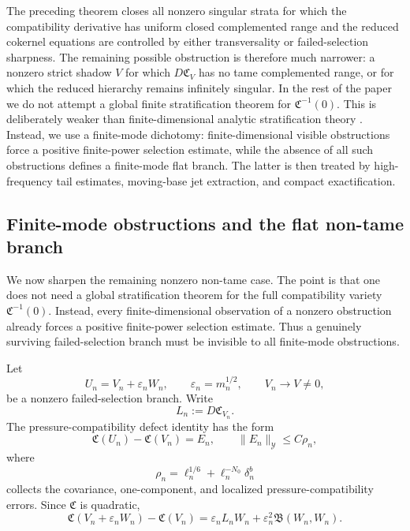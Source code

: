 \documentclass[11pt]{article}
\numberwithin{equation}{section}
\theoremstyle{plain}
\theoremstyle{definition}
\theoremstyle{remark}
\newcommand{\calB}{\mathfrak B}
\newcommand{\calC}{\mathfrak C}
\newcommand{\calY}{\mathcal Y}
\begin{document}
The preceding theorem closes all nonzero singular strata for which the compatibility derivative has
uniform closed complemented range and the reduced cokernel equations are controlled by either
transversality or failed-selection sharpness.  The remaining possible obstruction is therefore much
narrower: a nonzero strict shadow \(V\) for which \(D\calC_V\) has no tame complemented range, or for
which the reduced hierarchy remains infinitely singular.  In the rest of the paper we do not attempt
a global finite stratification theorem for \(\calC^{-1}(0)\).  This is deliberately weaker than finite-dimensional analytic stratification theory \cite{BierstoneMilman1988,Kurdyka1998}.  Instead, we use a finite-mode dichotomy:
finite-dimensional visible obstructions force a positive finite-power selection estimate, while the
absence of all such obstructions defines a finite-mode flat branch.  The latter is then treated by
high-frequency tail estimates, moving-base jet extraction, and compact exactification.


\subsection{Finite-mode obstructions and the flat non-tame branch}
\label{pIII:sec:finite-mode-obstructions}

We now sharpen the remaining nonzero non-tame case.  The point is that one does not need a
global stratification theorem for the full compatibility variety \(\calC^{-1}(0)\).  Instead, every
finite-dimensional observation of a nonzero obstruction already forces a positive finite-power
selection estimate.  Thus a genuinely surviving failed-selection branch must be invisible to all
finite-mode obstructions.

Let
\[
        U_n=V_n+\varepsilon_n W_n,
        \qquad
        \varepsilon_n=m_n^{1/2},
        \qquad
        V_n\to V\neq0,
\]
be a nonzero failed-selection branch.  Write
\[
        L_n:=D\calC_{V_n}.
\]
The pressure-compatibility defect identity has the form
\begin{equation}\label{pIII:eq:finite-mode-compat-defect}
        \calC(U_n)-\calC(V_n)=E_n,
        \qquad
        \|E_n\|_{\calY}\le C\rho_n,
\end{equation}
where
\[
        \rho_n=\ell_n^{1/6}+\ell_n^{-N_0}\delta_n^b
\]
collects the covariance, one-component, and localized pressure-compatibility errors.  Since
\(\calC\) is quadratic,
\begin{equation}\label{pIII:eq:quadratic-expansion-moving-base}
        \calC(V_n+\varepsilon_nW_n)-\calC(V_n)
        =
        \varepsilon_n L_nW_n
        +
        \varepsilon_n^2\calB(W_n,W_n).
\end{equation}
\end{document}
